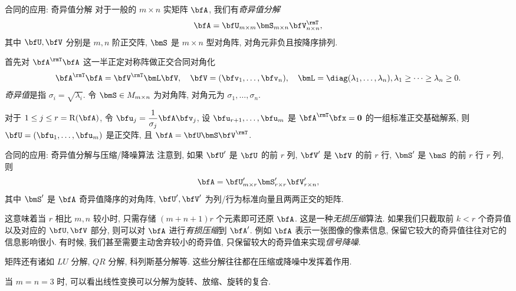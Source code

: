 \begin{frame}{合同的应用: 奇异值分解\noexer}
	\onslide<+->
	对于一般的 $m\times n$ 实矩阵 $\bfA$, 我们有\emph{奇异值分解}
	\[\bfA=\bfU_{m\times m}\bmS_{m\times n}\bfV^\rmT_{n\times n},\]
	其中 $\bfU,\bfV$ 分别是 $m,n$ 阶正交阵, $\bmS$ 是 $m\times n$ 型对角阵, 对角元非负且按降序排列.

	\onslide<+->
	首先对 $\bfA^\rmT\bfA$ 这一半正定对称阵做正交合同对角化
	\[\bfA^\rmT\bfA=\bfV^\rmT\bmL\bfV,\quad
	\bfV=(\bfv_1,\dots,\bfv_n),\quad
	\bmL=\diag(\lambda_1,\dots,\lambda_n),\lambda_1\ge\cdots\ge\lambda_n\ge0.\]
	\onslide<+->
	\emph{奇异值}是指 $\sigma_i=\sqrt{\lambda_i}$.
	\onslide<+->
	令 $\bmS\in M_{m\times n}$ 为对角阵, 对角元为 $\sigma_1,\dots,\sigma_n$.

	\onslide<+->
	对于 $1\le j\le r=\rank(\bfA)$, 令 $\bfu_j=\dfrac1{\sigma_j}\bfA \bfv_j$, 
	\onslide<+->
	设 $\bfu_{r+1},\dots,\bfu_m$ 是 $\bfA^\rmT\bfx={\bf0}$ 的一组标准正交基础解系,
	\onslide<+->
	则 $\bfU=(\bfu_1,\dots,\bfu_m)$ 是正交阵, 且 $\bfA=\bfU\bmS\bfV^\rmT$.
\end{frame}



\begin{frame}{合同的应用: 奇异值分解与压缩/降噪算法\noexer}
	\onslide<+->
	注意到, 如果 $\bfU'$ 是 $\bfU$ 的前 $r$ 列, $\bfV'$ 是 $\bfV$ 的前 $r$ 行, $\bmS'$ 是 $\bmS$ 的前 $r$ 行 $r$ 列,
	\onslide<+->
	则
	\[\bfA=\bfU'_{m\times r}\bmS'_{r\times r}\bfV'_{r\times n},\]
	其中 $\bmS'$ 是 $\bfA$ 奇异值降序的对角阵, $\bfU',\bfV'$ 为列/行为标准向量且两两正交的矩阵.

	\onslide<+->
	这意味着当 $r$ 相比 $m,n$ 较小时, 只需存储 $(m+n+1)r$ 个元素即可还原 $\bfA$.
	\onslide<+->
	这是一种\emph{无损压缩}算法.
	\onslide<+->
	如果我们只截取前 $k<r$ 个奇异值以及对应的 $\bfU,\bfV$ 部分, 则可以对 $\bfA$ 进行\emph{有损压缩}到 $\bfA'$.
	\onslide<+->
	例如 $\bfA$ 表示一张图像的像素信息, 保留它较大的奇异值往往对它的信息影响很小.
	\onslide<+->
	有时候, 我们甚至需要主动舍弃较小的奇异值, 只保留较大的奇异值来实现\emph{信号降噪}.

	\onslide<+->
	矩阵还有诸如 $LU$ 分解, $QR$ 分解, 科列斯基分解等.
	这些分解往往都在压缩或降噪中发挥着作用.

	\onslide<+->
	当 $m=n=3$ 时, 可以看出线性变换可以分解为旋转、放缩、旋转的复合.
\end{frame}
